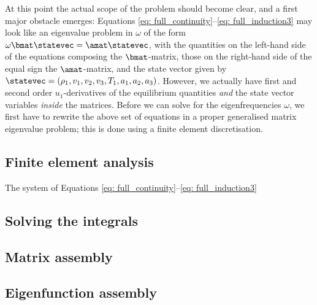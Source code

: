 At this point the actual scope of the problem should become clear, and a first major obstacle emerges: Equations \eqref{eq: full_continuity}--\eqref{eq: full_induction3} may look like an eigenvalue problem in $\omega$ of the form $\omega \bmat \statevec = \amat \statevec$, with the quantities on the left-hand side of the equations composing the $\bmat$-matrix, those on the right-hand side of the equal sign the $\amat$-matrix, and the state vector given by $\statevec = (\rho_1, v_1, v_2, v_3, T_1, a_1, a_2, a_3)$. However, we actually have first and second order $u_1$-derivatives of the equilibrium quantities \emph{and} the state vector variables \emph{inside} the matrices.
Before we can solve for the eigenfrequencies $\omega$, we first have to rewrite the above set of equations in a proper generalised matrix eigenvalue problem; this is done using a finite element discretisation.


\subsection{Finite element analysis} \label{ss: finite_elements}
The system of Equations \eqref{eq: full_continuity}--\eqref{eq: full_induction3}
\subsection{Solving the integrals} \label{ss: solving_integrals}
\subsection{Matrix assembly}
\subsection{Eigenfunction assembly}


\cleardoublepage
